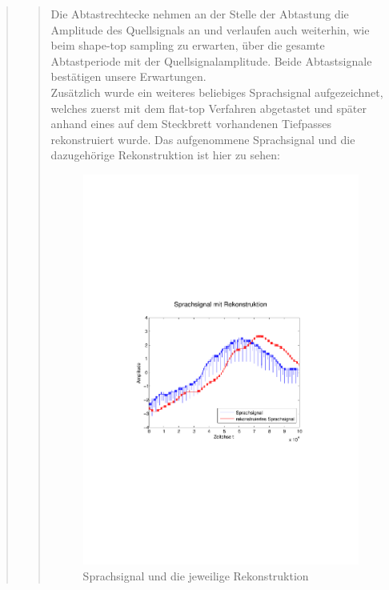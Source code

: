 \begin{quote}
\begin{quote}
            Die Abtastrechtecke nehmen an der Stelle der Abtastung die Amplitude des
            Quellsignals an und verlaufen auch weiterhin, wie beim shape-top
            sampling zu erwarten, über die gesamte Abtastperiode mit der
            Quellsignalamplitude. Beide Abtastsignale bestätigen unsere
            Erwartungen.\\
            
            Zusätzlich wurde ein weiteres beliebiges Sprachsignal aufgezeichnet,
            welches zuerst mit dem flat-top Verfahren abgetastet und später anhand
            eines auf dem Steckbrett vorhandenen Tiefpasses rekonstruiert wurde. Das
            aufgenommene Sprachsignal und die dazugehörige Rekonstruktion ist hier
            zu sehen:
            
            \begin{figure}[H]
            \centering
            \includegraphics[scale=0.6, trim = 3.5cm 9cm 4cm 9cm,
            clip]{./Bilder/sprache+rekon}
                \caption{Sprachsignal und die jeweilige Rekonstruktion}
            \end{figure}
            

\end{quote}
\end{quote}

